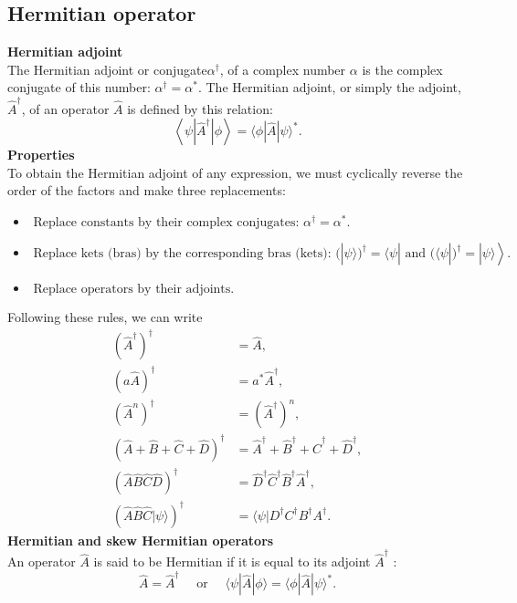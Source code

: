 \subsection{Hermitian operator}
\textbf{Hermitian adjoint}\\
The Hermitian adjoint or conjugate$ \alpha^{\dagger}$, of a complex number $\alpha$ is the complex conjugate of this number: $\alpha^{\dagger}=\alpha^{*}$. The Hermitian adjoint, or simply the adjoint, $\hat{A}^{\dagger}$, of an operator $\hat{A}$ is defined by this relation:
$$
\left\langle\psi\left|\hat{A}^{\dagger}\right| \phi\right\rangle=\langle\phi|\hat{A}| \psi\rangle^{*} .
$$
\textbf{Properties}\\
To obtain the Hermitian adjoint of any expression, we must cyclically reverse the order of the factors and make three replacements:
\begin{itemize}
	\item $\text { Replace constants by their complex conjugates: } \alpha^{\dagger}=\alpha^{*} \text {. }$
	\item $\text { Replace kets (bras) by the corresponding bras (kets): } \left.(|\psi\rangle)^{\dagger}=\langle\psi| \text { and }(\langle\psi|)^{\dagger}=|\psi\rangle\right\rangle \text {. }$
	\item  $\text { Replace operators by their adjoints. }$
\end{itemize}
Following these rules, we can write
$$
\begin{aligned}
\left(\hat{A}^{\dagger}\right)^{\dagger} &=\hat{A}, \\
(a \hat{A})^{\dagger} &=a^{*} \hat{A}^{\dagger}, \\
\left(\hat{A}^{n}\right)^{\dagger} &=\left(\hat{A}^{\dagger}\right)^{n}, \\
(\hat{A}+\hat{B}+\hat{C}+\hat{D})^{\dagger} &=\hat{A}^{\dagger}+\hat{B}^{\dagger}+\hat{C}^{\dagger}+\hat{D}^{\dagger}, \\
(\hat{A} \hat{B} \hat{C} \hat{D})^{\dagger} &=\hat{D}^{\dagger} \hat{C}^{\dagger} \hat{B}^{\dagger} \hat{A}^{\dagger}, \\
(\hat{A} \hat{B} \hat{C}|\psi\rangle)^{\dagger} &=\langle\psi| D^{\dagger} C^{\dagger} B^{\dagger} A^{\dagger} .
\end{aligned}
$$
\textbf{Hermitian and skew Hermitian operators}\\
An operator $\hat{A}$ is said to be Hermitian if it is equal to its adjoint $\hat{A}^{\dagger}$ :
$$
\hat{A}=\hat{A}^{\dagger} \quad \text { or } \quad\langle\psi|\hat{A}| \phi\rangle=\langle\phi|\hat{A}| \psi\rangle^{*} .
$$
